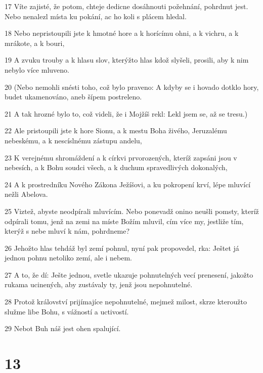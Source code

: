 \par 17 Víte zajisté, že potom, chteje dedicne dosáhnouti požehnání, pohrdnut jest. Nebo nenalezl místa ku pokání, ac ho koli s plácem hledal.
\par 18 Nebo nepristoupili jste k hmotné hore a k horícímu ohni, a k vichru, a k mrákote, a k bouri,
\par 19 A zvuku trouby a k hlasu slov, kterýžto hlas kdož slyšeli, prosili, aby k nim nebylo více mluveno.
\par 20 (Nebo nemohli snésti toho, což bylo praveno: A kdyby se i hovado dotklo hory, budet ukamenováno, aneb šípem postreleno.
\par 21 A tak hrozné bylo to, což videli, že i Mojžíš rekl: Lekl jsem se, až se tresu.)
\par 22 Ale pristoupili jste k hore Sionu, a k mestu Boha živého, Jeruzalému nebeskému, a k nescíslnému zástupu andelu,
\par 23 K verejnému shromáždení a k církvi prvorozených, kteríž zapsáni jsou v nebesích, a k Bohu soudci všech, a k duchum spravedlivých dokonalých,
\par 24 A k prostredníku Nového Zákona Ježíšovi, a ku pokropení krví, lépe mluvící nežli Abelova.
\par 25 Viztež, abyste neodpírali mluvícím. Nebo ponevadž onino neušli pomsty, kteríž odpírali tomu, jenž na zemi na míste Božím mluvil, cím více my, jestliže tím, kterýž s nebe mluví k nám, pohrdneme?
\par 26 Jehožto hlas tehdáž byl zemí pohnul, nyní pak propovedel, rka: Ještet já jednou pohnu netoliko zemí, ale i nebem.
\par 27 A to, že dí: Ješte jednou, svetle ukazuje pohnutelných vecí prenesení, jakožto rukama ucinených, aby zustávaly ty, jenž jsou nepohnutelné.
\par 28 Protož království prijímajíce nepohnutelné, mejmež milost, skrze kteroužto služme libe Bohu, s vážností a uctivostí.
\par 29 Nebot Buh náš jest ohen spalující.

\chapter{13}

